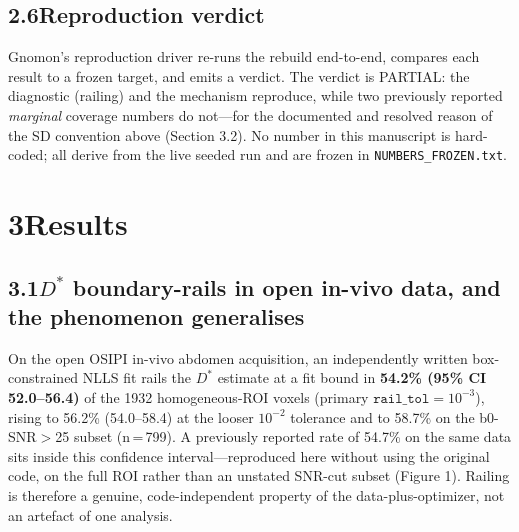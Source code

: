 \documentclass[11pt]{article}
\newcommand{\Dstar}{\ensuremath{D^{*}}}
\begin{document}
\subsection*{2.6\quad Reproduction verdict}

Gnomon's reproduction driver re-runs the rebuild end-to-end, compares each result to a
frozen target, and emits a verdict. The verdict is PARTIAL: the diagnostic (railing) and
the mechanism reproduce, while two previously reported \emph{marginal} coverage numbers
do not---for the documented and resolved reason of the SD convention above (Section 3.2).
No number in this manuscript is hard-coded; all derive from the live seeded run and are
frozen in \texttt{NUMBERS\_FROZEN.txt}.

\section*{3\quad Results}

\subsection*{3.1\quad \Dstar{} boundary-rails in open in-vivo data, and the phenomenon generalises}

On the open OSIPI in-vivo abdomen acquisition, an independently written box-constrained
NLLS fit rails the \Dstar{} estimate at a fit bound in \textbf{54.2\% (95\% CI
52.0--56.4)} of the 1932 homogeneous-ROI voxels (primary $\texttt{rail\_tol}=10^{-3}$),
rising to 56.2\% (54.0--58.4) at the looser $10^{-2}$ tolerance and to 58.7\% on the
b0-SNR$>$25 subset (n\,=\,799). A previously reported rate of 54.7\% on the same data
sits inside this confidence interval---reproduced here without using the original code,
on the full ROI rather than an unstated SNR-cut subset (Figure 1). Railing is therefore a
genuine, code-independent property of the data-plus-optimizer, not an artefact of one
analysis.
\end{document}
